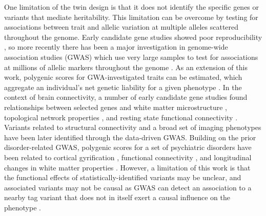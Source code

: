 One limitation of the twin design is that it does not identify the specific genes or variants that mediate heritability. This limitation can be overcome by testing for associations between trait and allelic variation at multiple alleles scattered throughout the genome. Early candidate gene studies showed poor reproducibility \citep{Hutchison2004,Sullivan2007}, so more recently there has been a major investigation in genome-wide association studies (GWAS) which use very large samples to test for associations at millions of allelic markers throughout the genome \citep{Bush2012}. As an extension of this work, polygenic scores for GWA-investigated traits can be estimated, which aggregate an individual’s net genetic liability for a given phenotype \citep{Torkamani2018}. In the context of brain connectivity, a number of early candidate gene studies found relationships between selected genes and white matter microstructure \citep{Braskie2012,Chiang2011,Jahanshad2012b}, topological network properties \citep{Dennis2011}, and resting state functional connectivity \citep{Filippini2009,Trachtenberg2012,Westlye2011}. Variants related to structural connectivity \citep{Chiang2009,Jahanshad2012a,Jahanshad2013} and a broad set of imaging phenotypes \citep{Elliott2018} have been later identified through the data-driven GWAS. Building on the prior disorder-related GWAS, polygenic scores for a set of psychiatric disorders have been related to cortical gyrification \citep{Liu2016a}, functional connectivity \citep{Dezhina2018,Sadeh2018,Wang2017}, and longitudinal changes in white matter properties \citep{Alloza2018}. However, a limitation of this work is that the functional effects of statistically-identified variants may be unclear, and associated variants may not be causal as GWAS can detect an association to a nearby tag variant that does not in itself exert a causal influence on the phenotype \citep{Wang2010}.

